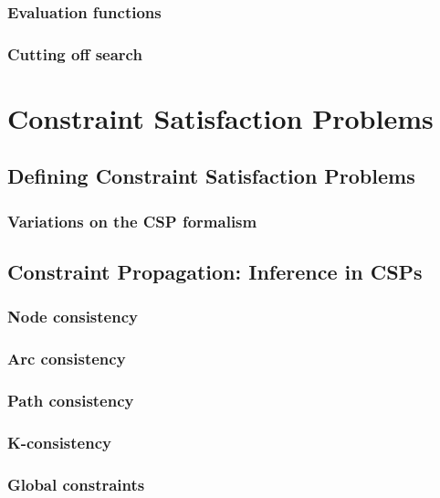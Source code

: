 \documentclass[11pt]{article}
\begin{document}
\subsubsection{Evaluation functions}


\subsubsection{Cutting off search}


\newpage
\section{Constraint Satisfaction Problems}

\subsection{Defining Constraint Satisfaction Problems}

\subsubsection{Variations on the CSP formalism}

\subsection{Constraint Propagation: Inference in CSPs}

\subsubsection{Node consistency}

\subsubsection{Arc consistency}

\subsubsection{Path consistency}

\subsubsection{K-consistency}

\subsubsection{Global constraints}
\end{document}
